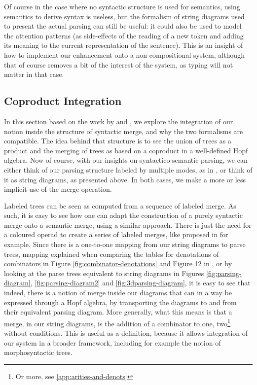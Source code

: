 Of course in the case where no syntactic structure is used for semantics,
using semantics to derive syntax is useless, but the formalism of string
diagrams used to present the actual parsing can still be useful:
it could also be used to model the attention patterns (as side-effects of the
reading of a new token and adding its meaning to the current representation
of the sentence).
This is an insight of how to implement our enhancement onto a non-compositional
system, although that of course removes a bit of the interest of the system, as
typing will not matter in that case.

\subsection{Coproduct Integration}
In this section based on the work by
\cite{marcollimatildeetchomskynoametberwickrobertc.MathematicalStructureSyntactic}
and \cite{senturiaAlgebraicStructureMorphosyntax2025},
we explore the integration of our notion inside the structure of syntactic
merge, and why the two formalisms are compatible.
The idea behind that structure is to see the union of trees as a product and
the merging of trees as based on a coproduct in a well-defined Hopf algebra.
Now of course, with our insights on syntactico-semantic parsing, we can either
think of our parsing structure labeled by multiple modes, as in
\cite{bumfordEffectdrivenInterpretationFunctors2025}, or think of it as string
diagrams, as presented above.
In both cases, we make a more or less implicit use of the merge operation.

\medskip

Labeled trees can be seen as computed from a sequence of labeled merge.
As such, it is easy to see how one can adapt the construction of a purely
syntactic merge onto a semantic merge, using a similar approach.
There is just the need for a coloured operad to create a series of labeled
merges, like proposed in
\cite{melliesCategoricalContoursChomskySchutzenberger2025} for example.
Since there is a one-to-one mapping from our string diagrams to parse trees,
mapping explained when comparing the tables for denotations of combinators
in Figure \ref{fig:combinator-denotations} and Figure 12 in
\cite{bumfordEffectdrivenInterpretationFunctors2025}, or by looking at the
parse trees equivalent to string diagrams in Figures \ref{fig:parsing-diagram},
\ref{fig:parsing-diagram2} and \ref{fig:3dparsing-diagram}, it is easy to see
that indeed, there is a notion of merge inside our diagrams that can in a way
be expressed through a Hopf algebra, by transporting the diagrams to and from
their equivalent parsing diagram.
More generally, what this means is that a merge, in our string diagrams, is
the addition of a combinator to one, two\footnote{Or more, see
	\ref{app:arities-and-denots}} without conditions.
This is useful as a definition, because it allows integration of our system in
a broader framework, including for example the notion of morphosyntactic trees.

